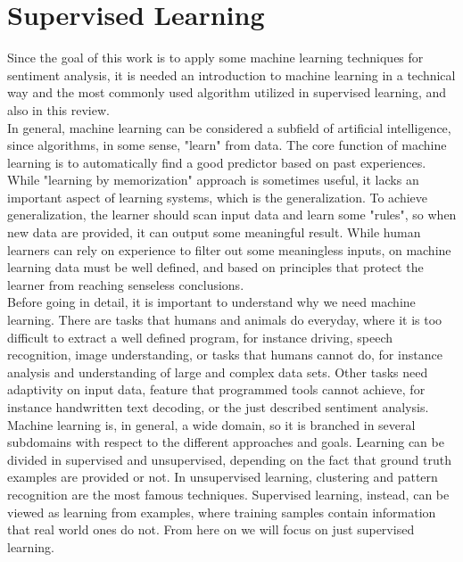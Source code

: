 \section{Supervised Learning}
Since the goal of this work is to apply some machine learning techniques for sentiment analysis, it is needed an introduction to machine learning in a technical way and the most commonly used algorithm utilized in supervised learning, and also in this review.\\
In general, machine learning can be considered a subfield of artificial intelligence, since algorithms, in some sense, "learn" from data. The core function of machine learning is to automatically find a good predictor based on past experiences. While "learning by memorization" approach is sometimes useful, it lacks an important aspect of learning systems, which is the generalization. To achieve generalization, the learner should scan input data and learn some "rules", so when new data are provided, it can output some meaningful result. While human learners can rely on experience to filter out some meaningless inputs, on machine learning data must be well defined, and based on principles that protect the learner from reaching senseless conclusions.\\
Before going in detail, it is important to understand why we need machine learning. There are tasks that humans and animals do everyday, where it is too difficult to extract a well defined program, for instance driving, speech recognition, image understanding, or tasks that humans cannot do, for instance analysis and understanding of large and complex data sets. Other tasks need adaptivity on input data, feature that programmed tools cannot achieve, for instance handwritten text decoding, or the just described sentiment analysis.\\
Machine learning is, in general, a wide domain, so it is branched in several subdomains with respect to the different approaches and goals. Learning can be divided in supervised and unsupervised, depending on the fact that ground truth examples are provided or not. In unsupervised learning, clustering and pattern recognition are the most famous techniques. Supervised learning, instead, can be viewed as learning from examples, where training samples contain information that real world ones do not. From here on we will focus on just supervised learning.\\

